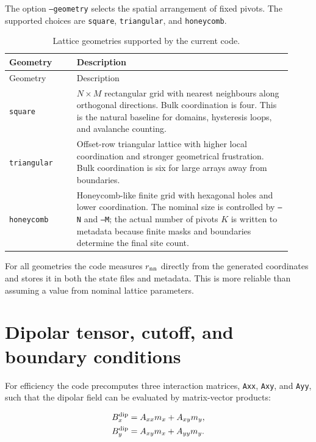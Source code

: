 \documentclass[11pt,a4paper]{article}
\newcommand{\code}[1]{\texttt{#1}}
\begin{document}
The option \code{--geometry} selects the spatial arrangement of fixed pivots. The supported choices are \code{square}, \code{triangular}, and \code{honeycomb}.

\begin{longtable}{p{0.22\linewidth}p{0.70\linewidth}}
\caption{Lattice geometries supported by the current code.}\label{tab:geometries}\\
\toprule
Geometry & Description \\
\midrule
\endfirsthead
\toprule
Geometry & Description \\
\midrule
\endhead
\code{square} & $N\times M$ rectangular grid with nearest neighbours along orthogonal directions. Bulk coordination is four. This is the natural baseline for domains, hysteresis loops, and avalanche counting. \\
\code{triangular} & Offset-row triangular lattice with higher local coordination and stronger geometrical frustration. Bulk coordination is six for large arrays away from boundaries. \\
\code{honeycomb} & Honeycomb-like finite grid with hexagonal holes and lower coordination. The nominal size is controlled by \code{--N} and \code{--M}; the actual number of pivots $K$ is written to metadata because finite masks and boundaries determine the final site count. \\
\bottomrule
\end{longtable}

For all geometries the code measures $r_{\rm nn}$ directly from the generated coordinates and stores it in both the state files and metadata. This is more reliable than assuming a value from nominal lattice parameters.

\section{Dipolar tensor, cutoff, and boundary conditions}
\label{sec:tensor}

For efficiency the code precomputes three interaction matrices, \code{Axx}, \code{Axy}, and \code{Ayy}, such that the dipolar field can be evaluated by matrix-vector products:

\begin{align}
B_x^{\rm dip} &= A_{xx} m_x + A_{xy} m_y,\\
B_y^{\rm dip} &= A_{xy} m_x + A_{yy} m_y.
\end{align}
\end{document}
